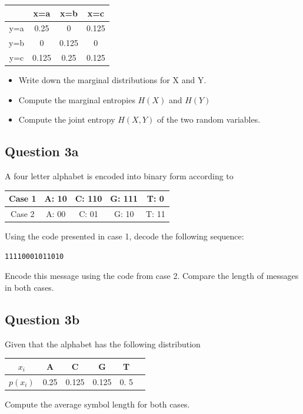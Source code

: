 \documentclass[a4paper,12pt]{article}
\begin{document}
\begin{center}
\begin{tabular}{|c|c|c|c|}
\hline
	&	x=a	&	x=b	&	x=c	\\ \hline
y=a	&	0.25	&	0	&	0.125	\\ \hline
y=b	&	0	&	0.125	&	0	\\ \hline
y=c	&	0.125	&	0.25	&	0.125	\\ \hline
\end{tabular} 
\end{center}

\begin{itemize}
\item Write down the marginal distributions for X and Y.

\item Compute the marginal entropies $H(X)$ and $H(Y)$

\item Compute the joint entropy $H(X,Y)$ of the two random variables.
\end{itemize}
\newpage
\subsection*{Question 3a}
A four letter alphabet is encoded into binary form according to
\begin{center}
\begin{tabular}{|c|c|c|c|c|}
\hline Case 1	&	A:  10 	&	C:  110	&	G:  111 &	T:  0  \\ \hline
Case 2	&	A:  00	&	C:  01	&		G: 10	&	T: 11	\\ \hline
\end{tabular} 
\end{center}
Using the code presented in case 1, decode the following sequence:
\begin{verbatim}	
11110001011010
\end{verbatim}

\noindent Encode this message using the code from case 2. Compare the length of messages in both cases.

\subsection*{Question 3b}
Given that the alphabet has the following distribution 
\begin{center}
\begin{tabular}{|c|c|c|c|c|c|}
\hline
$x_i$	& A	& C	& G	& T \\ \hline
$p(x_i)$	& 0.25	& 0.125	& 0.125	& 0. 5 \\ \hline
\end{tabular} 
\end{center}
Compute the average symbol length for both cases.
\end{document}
